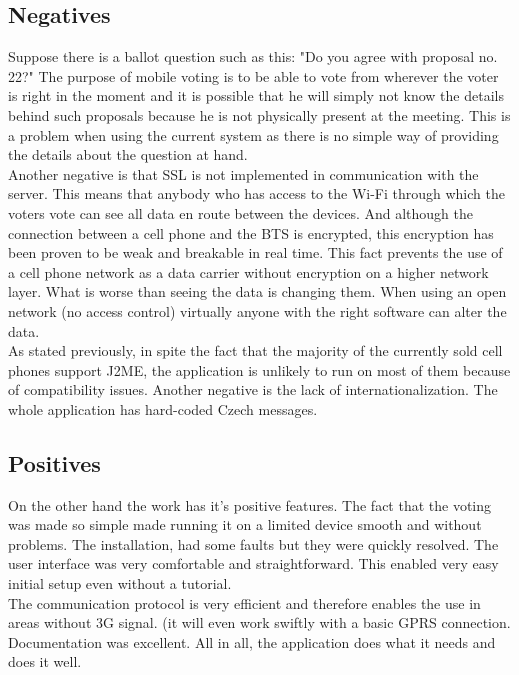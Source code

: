 \documentclass[11pt,twoside,a4paper]{book}
\begin{document}
\subsection{Negatives}
Suppose there is a ballot question such as this: "Do you agree with proposal no. 22?" The purpose of mobile voting is to be able to vote from wherever the voter is right in the moment and it is possible that he will simply not know the details behind such proposals because he is not physically present at the meeting. This is a problem when using the current system as there is no simple way of providing the details about the question at hand.\\
Another negative is that SSL is not implemented in communication with the server. This means that anybody who has access to the Wi-Fi through which the voters vote can see all data en route between the devices. And although the connection between a cell phone and the BTS\cite{whatISBTS}  is encrypted, this encryption has been proven to be weak\cite{GSMCypherWeakness} and breakable in real time. This fact  prevents the use of a cell phone network as a data carrier without encryption on a higher network layer. What is worse than seeing the data is changing them. When using an open network (no access control) virtually anyone with the right software can alter the data.\\
As stated previously, in spite the fact that the majority of the currently sold cell phones support J2ME, the application is unlikely to run on most of them because of compatibility issues.\cite{bakalarkaJV}
Another negative is the lack of internationalization. The whole application has hard-coded Czech messages. 

\subsection{Positives}
On the other hand the work has it's positive features. The fact that the voting was made so simple made running it on a limited device smooth and without problems. The installation, had some faults but they were quickly resolved. The user interface was very comfortable and straightforward. This enabled very easy initial setup even without a tutorial.\\
The communication protocol is very efficient and therefore enables the use in areas without 3G signal. (it will even work swiftly with a basic GPRS connection. Documentation was excellent. All in all, the application does what it needs and does it well.
\end{document}
